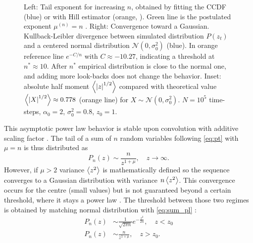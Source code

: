 \documentclass[FinalReport.tex]{subfiles}
\begin{document}
\begin{figure}[h!]
	\centering
	\caption{Left: Tail exponent for increasing $n$, obtained by fitting the CCDF (blue) or with Hill estimator (orange, \cite{Hill75}). Green line is the postulated exponent $\mu^{(n)}=n$ \cite{OptCont,FrontNanoScience}.
	Right: Convergence toward a Gaussian. Kullback-Leibler divergence between simulated distribution $P(z_t)$ and a centered normal distribution $\mathcal{N}(0,\sigma_0^2)$ (blue). In orange reference line $e^{-C/n}$ with $C\approx-10.27$, indicating a threshold at $n^*\approx 10$. After $n^*$ empirical distribution is close to the normal one, and adding more look-backs does not change the behavior. Inset: absolute half moment $\expval{\abs{z}^{1/2}}$ compared with theoretical value $\expval{\abs{X}^{1/2}} \approx0.778$ (orange line) for $X\sim\mathcal{N}(0,\sigma_0^2)$. $N=10^5$ time-steps, $\alpha_0=2$, $\sigma_0^2=0.8$, $z_0=1$.}
	\label{fig:KL_n}
\end{figure} 


This asymptotic power law behavior is stable upon convolution with additive scaling factor \cite[chap.~4]{CritPhenom}. The tail of a sum of $n$ random variables following \eqref{eq:pt} with $\mu=n$ is thus distributed as  
\begin{equation}\label{eq:sum_pl}
	P_n(z)\sim \frac{n}{z^{1+\mu}}, \quad z\rightarrow\infty.	
\end{equation}
However, if $\mu>2$ variance $\expval{z^2}$ is mathematically defined so the sequence converges to a Gaussian distribution with variance $n\expval{z^2}$. This convergence occurs for the centre (small values) but is not guaranteed beyond a certain threshold, where it stays a power law \cite[chap.~3]{CritPhenom}. The threshold between those two regimes is obtained by matching normal distribution with \eqref{eq:sum_pl} :
\begin{subequations}\label{eq:z0}
	\begin{align}
	P_n(z)&\sim \frac{1}{\sqrt{2\pi n}}e^{-\frac{z^2}{2n}}, \quad z<z_0\\
	P_n(z)&\sim \frac{n}{z^{1+\mu}}, \quad z>z_0.
	\end{align}
\end{subequations}
\end{document}
